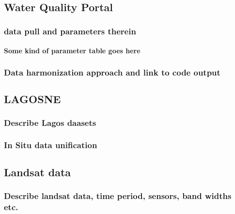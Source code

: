 \documentclass[]{article}
\let\oldparagraph\paragraph
\renewcommand{\paragraph}[1]{\oldparagraph{#1}\mbox{}}
\begin{document}
\hypertarget{water-quality-portal}{%
\subsection{Water Quality Portal}\label{water-quality-portal}}

\hypertarget{data-pull-and-parameters-therein}{%
\subsubsection{data pull and parameters
therein}\label{data-pull-and-parameters-therein}}

\hypertarget{some-kind-of-parameter-table-goes-here}{%
\paragraph{Some kind of parameter table goes
here}\label{some-kind-of-parameter-table-goes-here}}

\hypertarget{data-harmonization-approach-and-link-to-code-output}{%
\subsubsection{Data harmonization approach and link to code
output}\label{data-harmonization-approach-and-link-to-code-output}}

\hypertarget{lagosne}{%
\subsection{LAGOSNE}\label{lagosne}}

\hypertarget{describe-lagos-daasets}{%
\subsubsection{Describe Lagos daasets}\label{describe-lagos-daasets}}

\hypertarget{in-situ-data-unification}{%
\subsubsection{In Situ data
unification}\label{in-situ-data-unification}}

\hypertarget{landsat-data}{%
\subsection{Landsat data}\label{landsat-data}}

\hypertarget{describe-landsat-data-time-period-sensors-band-widths-etc.}{%
\subsubsection{Describe landsat data, time period, sensors, band widths
etc.}\label{describe-landsat-data-time-period-sensors-band-widths-etc.}}
\end{document}
